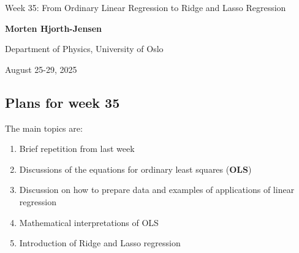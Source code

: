 \documentclass[%
oneside,                 %
final,                   %
10pt]{article}
\begin{document}

\newcommand{\exercisesection}[1]{\subsection*{#1}}






\thispagestyle{empty}

\begin{center}
{\LARGE\bf
\begin{spacing}{1.25}
Week 35: From Ordinary Linear Regression to Ridge and Lasso Regression
\end{spacing}
}
\end{center}


\begin{center}
{\bf Morten Hjorth-Jensen}
\end{center}

    \begin{center}
\centerline{{\small Department of Physics, University of Oslo}}
\end{center}
    

\begin{center}
August 25-29, 2025
\end{center}

\vspace{1cm}


\subsection{Plans for week 35}

The main topics are:

\begin{enumerate}
\item Brief repetition from last week

\item Discussions  of the equations for ordinary least squares (\textbf{OLS})

\item Discussion on how to prepare data and examples of applications of linear regression

\item Mathematical interpretations of OLS

\item Introduction of Ridge and Lasso regression
\end{enumerate}
\end{document}
